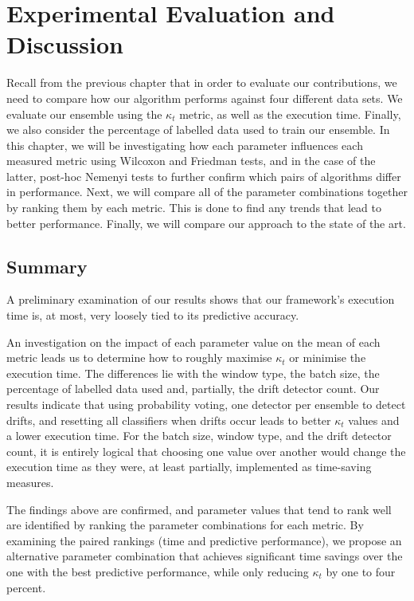 
\chapter{Experimental Evaluation and Discussion\label{chapter:evaluation_discussion}} %

Recall from the previous chapter that in order to evaluate our contributions, we need to compare how our algorithm performs against four different data sets. We evaluate our ensemble using the $\kappa_t$ metric, as well as the execution time. Finally, we also consider the percentage of labelled data used to train our ensemble.
In this chapter, we will be investigating how each parameter influences each measured metric using Wilcoxon and Friedman tests, and in the case of the latter, post-hoc Nemenyi tests to further confirm which pairs of algorithms differ in performance. Next, we will compare all of the parameter combinations together by ranking them by each metric. This is done to find any trends that lead to better performance. Finally, we will compare our approach to the state of the art.

\section{Summary}
A preliminary examination of our results shows that our framework's execution time is, at most, very loosely tied to its predictive accuracy.

An investigation on the impact of each parameter value on the mean of each metric leads us to determine how to roughly maximise $\kappa_t$ or minimise the execution time.
The differences lie with the window type, the batch size, the percentage of labelled data used and, partially, the drift detector count. Our results indicate that using probability voting, one detector per ensemble to detect drifts, and resetting all classifiers when drifts occur leads to better $\kappa_t$ values and a lower execution time. For the batch size, window type, and the drift detector count, it is entirely logical that choosing one value over another would change the execution time as they were, at least partially, implemented as time-saving measures.

The findings above are confirmed, and parameter values that tend to rank well are identified by ranking the parameter combinations for each metric. By examining the paired rankings (time and predictive performance), we propose an alternative parameter combination that achieves significant time savings over the one with the best predictive performance, while only reducing $\kappa_t$ by one to four percent.

